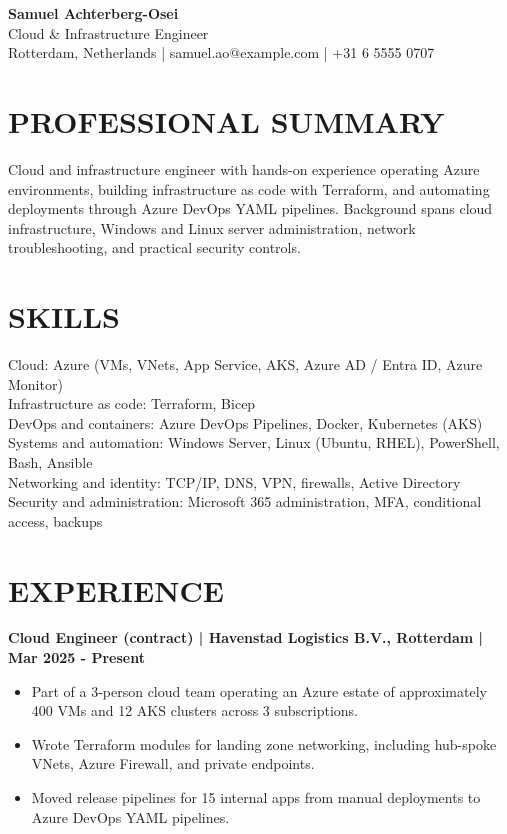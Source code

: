 \documentclass[11pt,a4paper]{article}
\begin{document}
\begin{center}
{\Huge\bfseries\color{primarycolor} Samuel Achterberg-Osei}\\[0.25em]
{\large\color{accentcolor} Cloud \& Infrastructure Engineer}\\[0.25em]
Rotterdam, Netherlands | samuel.ao@example.com | +31 6 5555 0707
\end{center}

\section*{PROFESSIONAL SUMMARY}
Cloud and infrastructure engineer with hands-on experience operating Azure environments, building infrastructure as code with Terraform, and automating deployments through Azure DevOps YAML pipelines. Background spans cloud infrastructure, Windows and Linux server administration, network troubleshooting, and practical security controls.

\section*{SKILLS}
\noindent Cloud: Azure (VMs, VNets, App Service, AKS, Azure AD / Entra ID, Azure Monitor)\\
Infrastructure as code: Terraform, Bicep\\
DevOps and containers: Azure DevOps Pipelines, Docker, Kubernetes (AKS)\\
Systems and automation: Windows Server, Linux (Ubuntu, RHEL), PowerShell, Bash, Ansible\\
Networking and identity: TCP/IP, DNS, VPN, firewalls, Active Directory\\
Security and administration: Microsoft 365 administration, MFA, conditional access, backups

\section*{EXPERIENCE}
\noindent\textbf{Cloud Engineer (contract) | Havenstad Logistics B.V., Rotterdam | Mar 2025 - Present}
\begin{itemize}
\item Part of a 3-person cloud team operating an Azure estate of approximately 400 VMs and 12 AKS clusters across 3 subscriptions.
\item Wrote Terraform modules for landing zone networking, including hub-spoke VNets, Azure Firewall, and private endpoints.
\item Moved release pipelines for 15 internal apps from manual deployments to Azure DevOps YAML pipelines.
\end{itemize}
\end{document}
